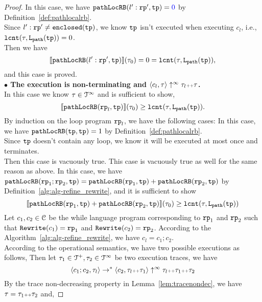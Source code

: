 \begin{proof}
  In this case, we have $\outinB(l': \rprog', \tpath) = \highlight{0} $ by Definition~\ref{def:pathlocalrb}.
  \\
  Since $l': \mathtt{rp}' \neq \mathtt{enclosed}(\mathtt{tp})$, we know $\mathtt{tp}$ isn't executed when executing $c_l$, i.e., $\mathtt{lcnt}(\mathtt{\tau}, \mathtt{L}_{\mathtt{path}}(\mathtt{tp})) = 0$.
  \\
  Then we have
  \[
    \llbracket \mathtt{pathLocRB}(l': \mathtt{rp}', \mathtt{tp}) \rrbracket(\mathtt{\tau}_0) = 0 = \mathtt{lcnt}(\mathtt{\tau}, \mathtt{L}_{\mathtt{path}}(\mathtt{tp})),
    \]
  and this case is proved.
\\
\textbf{$\bullet$ The execution is non-terminating and {$\langle {c_l}, \mathtt{\tau} \rangle \uparrow^{\infty} \mathtt{\tau}_l {\scriptscriptstyle ++} \mathtt{\tau}$}.} 
\\
 In this case we know $\mathtt{\tau} \in \mathcal{T}^{\infty}$ and is sufficient to show,
\[
  \llbracket \mathtt{pathLocRB}(\mathtt{rp}_l, \mathtt{tp}) \rrbracket(\mathtt{\tau}_0) \geq \mathtt{lcnt}(\mathtt{\tau}, \mathtt{L}_{\mathtt{path}}(\mathtt{tp})).
\]
By induction on the loop program $\mathtt{rp}_l$,
we have the following cases:
In this case, we have $\mathtt{pathLocRB}(\mathtt{tp}, \mathtt{tp}) = 1$ by Definition~\ref{def:pathlocalrb}. 
\\
Since $\mathtt{tp}$ doesn't contain any loop, we know it will be executed at most once and terminates.
\\
Then this case is vacuously true.
This case is vacuously true as well for the same reason as above.
In this case, we have $\mathtt{pathLocRB}(\mathtt{rp}_1;\mathtt{rp}_2, \mathtt{tp}) = \mathtt{pathLocRB}(\mathtt{rp}_1, \mathtt{tp}) + \mathtt{pathLocRB}(\mathtt{rp}_2, \mathtt{tp}) $ by Definition~\ref{alg:alg-refine_rewrite}, and
it is sufficient to show
\[
  \llbracket \mathtt{pathLocRB}(\mathtt{rp}_1, \mathtt{tp}) + \mathtt{pathLocRB}(\mathtt{rp}_2, \mathtt{tp}) \rrbracket(\mathtt{\tau}_0) \geq \mathtt{lcnt}(\mathtt{\tau}, \mathtt{L}_{\mathtt{path}}(\mathtt{tp})) 
\]
Let $c_1, c_2 \in \mathcal{C}$ be the while language program corresponding to $\mathtt{rp}_1$ and $\mathtt{rp}_2$ such that $\mathtt{Rewrite}(c_1) = \mathtt{rp}_1$ and $\mathtt{Rewrite}(c_2) = \mathtt{rp}_2$.
According to the Algorithm~\ref{alg:alg-refine_rewrite}, we have $c_l = c_1; c_2$.
\\
According to the operational semantics, we have two possible executions as follows,
Then let $\mathtt{\tau}_1 \in \mathcal{T}^{+}, \mathtt{\tau}_2 \in \mathcal{T}^{\infty}$ be two execution traces, we have
\[
  \langle c_1; c_2, \mathtt{\tau}_l \rangle \to^* \langle c_2, \mathtt{\tau}_l {\scriptscriptstyle ++} \mathtt{\tau}_1 \rangle \uparrow^{\infty} \mathtt{\tau}_l {\scriptscriptstyle ++} \mathtt{\tau}_1 {\scriptscriptstyle ++} \mathtt{\tau}_2
\]
By the trace non-decreasing property in Lemma~\ref{lem:tracenondec}, we have $\mathtt{\tau} = \mathtt{\tau}_1 {\scriptscriptstyle ++} \mathtt{\tau}_2$ and,

\end{proof}
